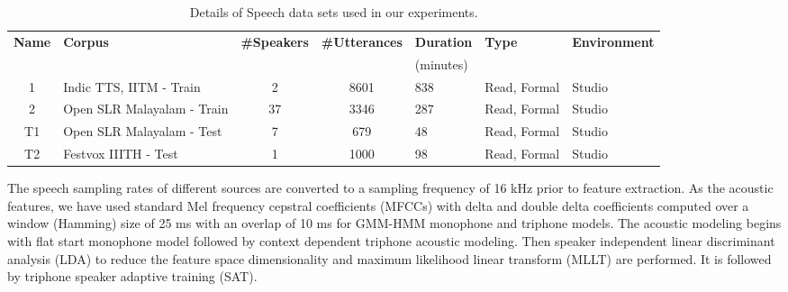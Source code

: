 \documentclass{ieeeaccess}
\begin{document}
\begin{table}[]
  \caption{Details of Speech data sets used in our experiments. }
  \label{speechdatasets}
        \centering
  \begin{tabular}{clcclll}
    \hline \hline
    \textbf{Name}& \textbf{Corpus}                                      & \textbf{\#Speakers}      & \textbf{\#Utterances}    & \textbf{Duration} &  \textbf{Type}   & \textbf{Environment}   \\
        &                                   &      &     & (minutes) &    & \\
    \hline
    1&Indic TTS, IITM \cite{baby2016resources}- Train          &2                          & 8601                      &838                         & Read, Formal          &Studio \\
    2&Open SLR Malayalam \cite{he-etal-2020-open} - Train &37                         & 3346                      &287                      &  Read, Formal         &Studio \\ 
    T1&Open SLR Malayalam \cite{he-etal-2020-open} - Test  &7                          & 679                       & 48                       &  Read, Formal         &Studio \\ 
    T2&Festvox IIITH \cite{prahallad2012iiit} - Test            &1                          &1000                       & 98                        & Read, Formal          &Studio \\

    \hline
    
    
  \end{tabular}

\end{table}


The speech sampling rates of different sources are converted to a sampling frequency of 16 kHz prior to feature extraction.  As the acoustic features, we have used standard Mel frequency cepstral coefficients (MFCCs) with delta and double delta coefficients computed over a window (Hamming) size of 25 ms with an overlap of 10 ms for GMM-HMM monophone and triphone models. The acoustic modeling begins with flat start monophone model followed by context dependent triphone acoustic modeling. Then speaker independent linear discriminant analysis (LDA) to reduce the feature space dimensionality and maximum likelihood linear transform (MLLT) are performed. It is followed by triphone speaker adaptive training (SAT).
\end{document}
